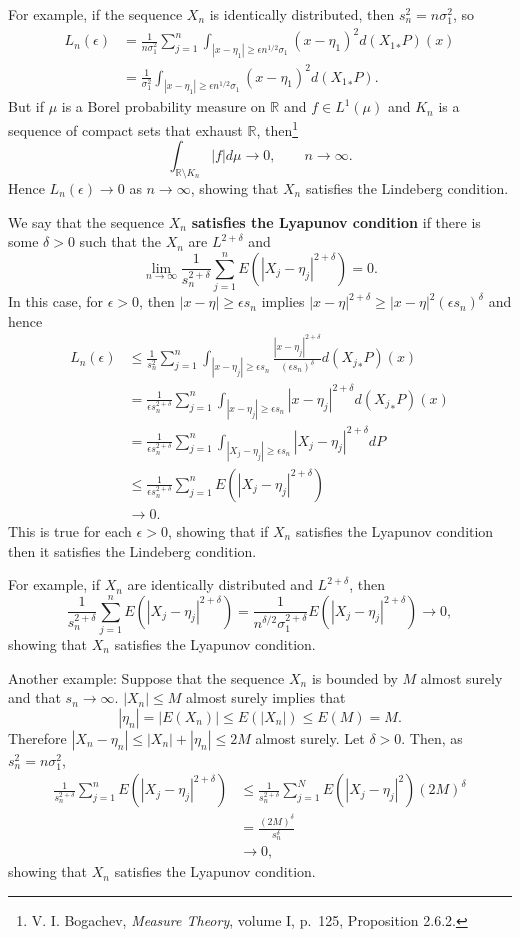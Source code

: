 \documentclass{article}
\theoremstyle{definition}
\theoremstyle{definition}
\begin{document}
For example, if the sequence $X_n$ is identically distributed, then
$s_n^2=n\sigma_1^2$, so
\begin{align*}
L_n(\epsilon) &= \frac{1}{n\sigma_1^2} \sum_{j=1}^n \int_{|x-\eta_1| \geq \epsilon n^{1/2} \sigma_1} (x-\eta_1)^2 d({X_1}_*P)(x)\\
&=\frac{1}{\sigma_1^2} \int_{|x-\eta_1| \geq \epsilon n^{1/2} \sigma_1} (x-\eta_1)^2 d({X_1}_*P).
\end{align*}
But if $\mu$ is a Borel probability measure on $\mathbb{R}$ and $f \in L^1(\mu)$ and $K_n$ is a sequence
of compact sets that exhaust $\mathbb{R}$, then\footnote{V. I. Bogachev, {\em Measure Theory}, volume I,
p.~125, Proposition 2.6.2.}
\[
\int_{\mathbb{R} \setminus K_n} |f| d\mu \to 0, \qquad n \to \infty.
\]
Hence $L_n(\epsilon) \to 0$ as $n \to \infty$, showing that $X_n$ satisfies the Lindeberg condition. 

We say that the sequence $X_n$ \textbf{satisfies the Lyapunov condition} if there is some $\delta>0$ such that the $X_n$ are $L^{2+\delta}$ and
\[
\lim_{n \to \infty} \frac{1}{s_n^{2+\delta}} \sum_{j=1}^n E(|X_j-\eta_j|^{2+\delta})=0.
\]
In this case, for $\epsilon>0$, then $|x-\eta| \geq \epsilon s_n$ implies
$|x-\eta|^{2+\delta} \geq |x-\eta|^2 (\epsilon s_n)^\delta$ and hence
\begin{align*}
L_n(\epsilon)&\leq \frac{1}{s_n^2} \sum_{j=1}^n \int_{|x-\eta_j| \geq \epsilon s_n} \frac{|x-\eta_j|^{2+\delta}}{(\epsilon s_n)^\delta} d({X_j}_*P)(x)\\
&=\frac{1}{\epsilon  s_n^{2+\delta}} \sum_{j=1}^n \int_{|x-\eta_j| \geq \epsilon s_n} |x-\eta_j|^{2+\delta} d({X_j}_*P)(x)\\
&=\frac{1}{\epsilon s_n^{2+\delta}} \sum_{j=1}^n \int_{|X_j-\eta_j| \geq \epsilon s_n} |X_j-\eta_j|^{2+\delta} dP\\
&\leq \frac{1}{\epsilon s_n^{2+\delta}} \sum_{j=1}^n E(|X_j-\eta_j|^{2+\delta})\\
&\to 0.
\end{align*}
This is true for each $\epsilon>0$, showing that if $X_n$ satisfies the Lyapunov condition then it satisfies the Lindeberg
condition.

For example, if
$X_n$ are identically distributed and $L^{2+\delta}$, then 
\[
\frac{1}{s_n^{2+\delta}} \sum_{j=1}^n E(|X_j-\eta_j|^{2+\delta}) = 
\frac{1}{n^{\delta/2} \sigma_1^{2+\delta}} E(|X_j-\eta_j|^{2+\delta}) \to 0,
\]
showing that $X_n$ satisfies the Lyapunov condition. 


Another example: Suppose that the sequence $X_n$ is bounded by $M$ almost surely and that $s_n \to \infty$.
$|X_n| \leq M$ almost surely implies that
\[
|\eta_n| = |E(X_n)| \leq E(|X_n|) \leq E(M) = M.
\]
Therefore $|X_n-\eta_n| \leq |X_n|+|\eta_n| \leq 2M$ almost surely. 
Let $\delta>0$. Then, as $s_n^2=n \sigma_1^2$,
\begin{align*}
\frac{1}{s_n^{2+\delta}} \sum_{j=1}^n E(|X_j-\eta_j|^{2+\delta})&\leq 
\frac{1}{s_n^{2+\delta}} \sum_{j=1}^N E(|X_j-\eta_j|^2) (2M)^{\delta}\\
&=\frac{(2M)^\delta}{s_n^{\delta}}\\
&\to 0,
\end{align*}
showing that $X_n$ satisfies the Lyapunov condition. 
\end{document}

